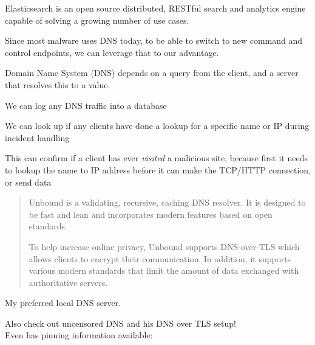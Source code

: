 \documentclass[Screen16to9,17pt]{foils}
\begin{document}


Elasticsearch is an open source distributed, RESTful search and analytics engine capable of solving a growing number of use cases.



Since most malware uses DNS today, to be able to switch to new command and control endpoints, we can leverage that to our advantage.

Domain Name System (DNS) depends on a query from the client, and a server that resolves this to a value.

\begin{list2}
\item We can log any DNS traffic into a database
\item We can look up if any clients have done a lookup for a specific name or IP during incident handling
\item This can confirm if a client has ever \emph{visited} a malicious site, because first it needs to lookup the name to IP address before it can make the TCP/HTTP connection, or send data
\end{list2}




\begin{quote}
Unbound is a validating, recursive, caching DNS resolver. It is designed to be fast and lean and incorporates modern features based on open standards.

To help increase online privacy, Unbound supports DNS-over-TLS which allows clients to encrypt their communication. In addition, it supports various modern standards that limit the amount of data exchanged with authoritative servers.
\end{quote}


My preferred local DNS server.

Also check out uncensored DNS and his DNS over TLS setup!\\
Even has pinning information available:\\ {\small{}}
\end{document}
